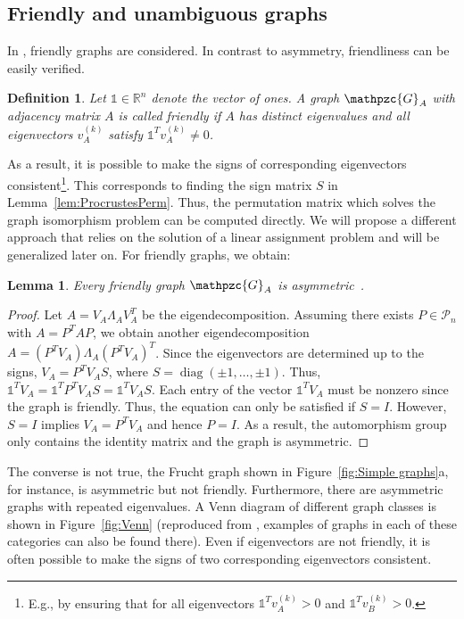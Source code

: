 \documentclass
[
    a4paper,
    DIV=11,
    abstracton
]
{scrartcl}
\newcommand{\R}{\mathbb{R}}
\newcommand{\mc}[1]{\mathpzc{#1}}
\DeclareMathOperator{\diag}{diag}
\newtheorem{lemma}[theorem]{Lemma}
\newtheorem{definition}[theorem]{Definition}
\theoremstyle{definition}
\begin{document}
\subsection{Friendly and unambiguous graphs}

In \cite{ABK15}, friendly graphs are considered. In contrast to asymmetry, friendliness can be easily verified.

\begin{definition} \label{def:Friendly graph}
Let $ \mathds{1} \in \R^n $ denote the vector of ones. A graph $ \mc{G}_A $ with adjacency matrix $ A $ is called \emph{friendly} if $ A $ has distinct eigenvalues and all eigenvectors $ v_A^{(k)} $ satisfy $ \mathds{1}^T v_A^{(k)} \ne 0 $.
\end{definition}

As a result, it is possible to make the signs of corresponding eigenvectors consistent\footnote{E.g., by ensuring that for all eigenvectors $ \mathds{1}^T v_A^{(k)} > 0 $ and $ \mathds{1}^T v_B^{(k)} > 0 $.}. This corresponds to finding the sign matrix $ S $ in Lemma~\ref{lem:ProcrustesPerm}. Thus, the permutation matrix which solves the graph isomorphism problem can be computed directly. We will propose a different approach that relies on the solution of a linear assignment problem and will be generalized later on. For friendly graphs, we obtain:

\begin{lemma}
Every friendly graph $ \mc{G}_A $ is asymmetric~\cite{ABK15}.
\end{lemma}

\begin{proof}
Let $ A = V_A \Lambda_A V_A^T $ be the eigendecomposition. Assuming there exists $ P \in \mathcal{P}_n $ with $ A = P^T A P $, we obtain another eigendecomposition $ A = (P^T V_A) \Lambda_A (P^T V_A)^T $. Since the eigenvectors are determined up to the signs, $ V_A = P^T V_A S $, where $ S = \diag(\pm 1, \dots, \pm 1) $. Thus, $ \mathds{1}^T V_A = \mathds{1}^T P^T V_A S = \mathds{1}^T V_A S $. Each entry of the vector $ \mathds{1}^T V_A $ must be nonzero since the graph is friendly. Thus, the equation can only be satisfied if $ S = I $. However, $ S = I $ implies $ V_A = P^T V_A $ and hence $ P = I $. As a result, the automorphism group only contains the identity matrix and the graph is asymmetric.
\end{proof}

The converse is not true, the Frucht graph shown in Figure~\ref{fig:Simple graphs}a, for instance, is asymmetric but not friendly. Furthermore, there are asymmetric graphs with repeated eigenvalues. A Venn diagram of different graph classes is shown in Figure~\ref{fig:Venn} (reproduced from \cite{FS15}, examples of graphs in each of these categories can also be found there). Even if eigenvectors are not friendly, it is often possible to make the signs of two corresponding eigenvectors consistent.
\end{document}
